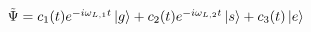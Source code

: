 \documentclass[preview]{standalone}
\begin{document}
$\tilde{\Psi} = c_1(t)e^{-i \omega_{L,1}t} \ket{g} + c_2(t)e^{-i \omega_{L,2}t} \ket{s} + c_3(t)\ket{e}$
\end{document}
